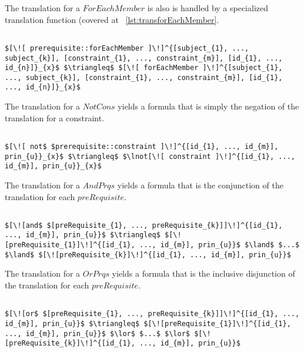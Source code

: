 The translation for a $ForEachMember$ is also is handled by a specialized translation function (covered at ~\ref{lst:transforEachMember}.

\lstset{mathescape, language=AST}  
\begin{lstlisting}[frame=single, caption={Prerequisite Translation {$\colon$} ForEachMember},label={lst:transpreRequisiteForEachMember}]

$[\![ prerequisite::forEachMember ]\!]^{[subject_{1}, ..., subject_{k}], [constraint_{1}, ..., constraint_{m}], [id_{1}, ..., id_{n}]}_{x}$ $\triangleq$ $[\![ forEachMember ]\!]^{[subject_{1}, ..., subject_{k}], [constraint_{1}, ..., constraint_{m}], [id_{1}, ..., id_{n}]}_{x}$ 	
\end{lstlisting}

The translation for a $NotCons$ yields a formula that is simply the negation of the translation for a constraint.

\lstset{mathescape, language=AST}  
\begin{lstlisting}[frame=single, caption={Prerequisite Translation {$\colon$} Not Constraint},label={lst:transpreRequisiteNotConstraint}]

$[\![ not$ $prerequisite::constraint ]\!]^{[id_{1}, ..., id_{m}], prin_{u}}_{x}$ $\triangleq$ $\lnot[\![ constraint ]\!]^{[id_{1}, ..., id_{m}], prin_{u}}_{x}$ 
\end{lstlisting}

The translation for a $AndPrqs$ yields a formula that is the conjunction of the translation for each $preRequisite$.

\lstset{mathescape, language=AST}  
\begin{lstlisting}[frame=single, caption={Prerequisite Translation {$\colon$} Conjunction },label={lst:transpreRequisiteAndPrqs}]

$[\![and$ $[preRequisite_{1}, ..., preRequisite_{k}]]\!]^{[id_{1}, ..., id_{m}], prin_{u}}$ $\triangleq$ $[\![preRequisite_{1}]\!]^{[id_{1}, ..., id_{m}], prin_{u}}$ $\land$ $...$ $\land$ $[\![preRequisite_{k}]\!]^{[id_{1}, ..., id_{m}], prin_{u}}$

\end{lstlisting}

The translation for a $OrPrqs$ yields a formula that is the inclusive disjunction of the translation for each $preRequisite$.

\lstset{mathescape, language=AST}  
\begin{lstlisting}[frame=single, caption={Prerequisite Translation {$\colon$} Inclusive Disjunction},label={lst:transpreRequisiteOrPrqs}]

$[\![or$ $[preRequisite_{1}, ..., preRequisite_{k}]]\!]^{[id_{1}, ..., id_{m}], prin_{u}}$ $\triangleq$ $[\![preRequisite_{1}]\!]^{[id_{1}, ..., id_{m}], prin_{u}}$ $\lor$ $...$ $\lor$ $[\![preRequisite_{k}]\!]^{[id_{1}, ..., id_{m}], prin_{u}}$

\end{lstlisting}

